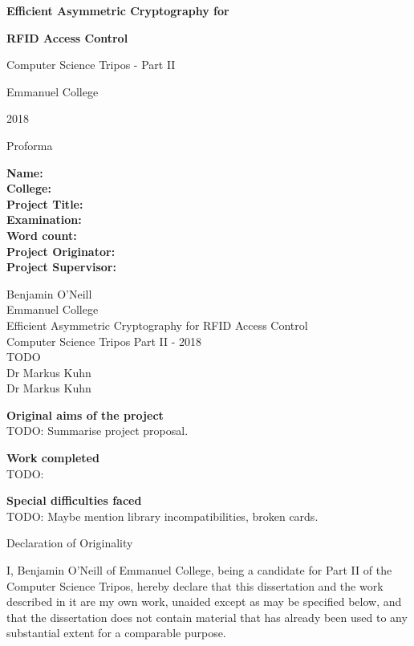 \documentclass[12pt]{article}
\begin{document}
\thispagestyle{empty}

\vfil

\centerline{\Large\bf Efficient Asymmetric Cryptography for}
\centerline{\Large\bf RFID Access Control}
\vspace{0.4in}
\centerline{\Large Computer Science Tripos - Part II}
\vspace{0.3in}
\centerline{\Large Emmanuel College}
\vspace{0.3in}
\centerline{\Large 2018}
\vfil
\pagebreak

\thispagestyle{empty}
\centerline{\Large Proforma}

\noindent
\begin{minipage}{0.3\textwidth}
\raggedright
{\bf Name:}\\
{\bf College:}\\
{\bf Project Title:}\\
{\bf Examination:}\\
{\bf Word count:}\\
{\bf Project Originator:}\\
{\bf Project Supervisor:}
\end{minipage}
\begin{minipage}{0.7\textwidth}
Benjamin O'Neill\\
Emmanuel College\\
Efficient Asymmetric Cryptography for RFID Access Control\\
Computer Science Tripos Part II - 2018\\
TODO\\
Dr Markus Kuhn\\
Dr Markus Kuhn
\end{minipage}

\vspace{0.3in}
{\large\bf Original aims of the project}\\
TODO: Summarise project proposal.

\vspace{0.3in}
{\large\bf Work completed}\\
TODO:

\vspace{0.3in}
{\large\bf Special difficulties faced}\\
TODO: Maybe mention library incompatibilities, broken cards.
\pagebreak

\centerline{\Large Declaration of Originality}
I, Benjamin O'Neill of Emmanuel College, being a candidate for Part II of the Computer Science Tripos, hereby declare that this dissertation and the work described in it are my own work, unaided except as may be specified below, and that the dissertation does not contain material that has already been used to any substantial extent for a comparable purpose.
\end{document}
